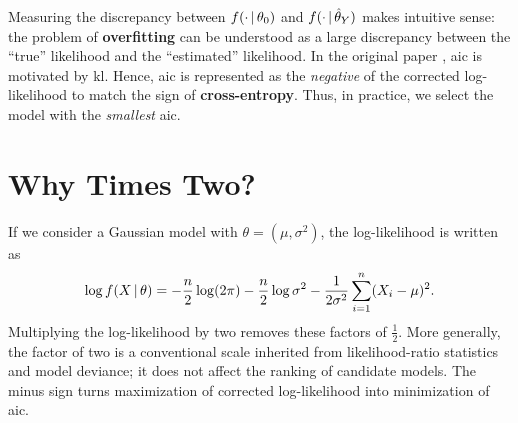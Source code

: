 \documentclass[a4paper,12pt]{article}
\begin{document}
Measuring the discrepancy between $f(\cdot\,|\,\theta_{0})$ and
$f(\cdot\,|\,\hat\theta_{Y})$ makes intuitive sense:
the problem of \textbf{overfitting} can be understood as a large discrepancy between the ``true'' likelihood and the ``estimated'' likelihood.
In the original paper \parencite{akaike-1974}, \acrshort{aic} is motivated by \acrshort{kl}.
Hence, \acrshort{aic} is represented as the \emph{negative} of the corrected log-likelihood to match the sign of \textbf{cross-entropy}.
Thus, in practice, we select the model with the \emph{smallest} \acrshort{aic}.

\section{Why Times Two?}

If we consider a Gaussian model with $\theta=(\mu,\sigma^2)$,
the log-likelihood is written as
\begin{align*}
	\log f(X\,|\, \theta)
	=
	- \frac{n}{2} \log(2\pi)
	- \frac{n}{2} \log\sigma^2
	- \frac{1}{2\sigma^2} \sum_{i=1}^{n} (X_{i} - \mu)^2.
\end{align*}
Multiplying the log-likelihood by two removes these factors of $\frac12$.
More generally, the factor of two is a conventional scale inherited from likelihood-ratio statistics and model deviance;
it does not affect the ranking of candidate models.
The minus sign turns maximization of corrected log-likelihood into minimization of \acrshort{aic}.
\asDemonstrated

\printbibliography
\end{document}
